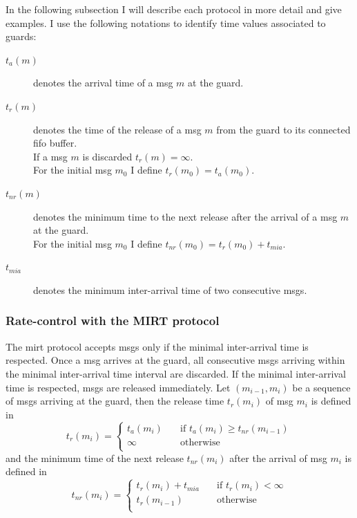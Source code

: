 In the following subsection I will describe each protocol in more detail and give examples.
I use the following notations to identify time values associated to guards:
\begin{description}
    \item[$t_{a}(m)$]
        denotes the arrival time of a \gls*{msg} $m$ at the guard.
    \item[$t_r(m)$]
        denotes the time of the release of a \gls*{msg} $m$ from the guard to its connected \gls{fifo} buffer.\\
        If a \gls*{msg} $m$ is discarded $t_r(m) = \infty$.\\
        For the initial \gls*{msg} $m_0$ I define $t_r(m_0) = t_a(m_0)$.
    \item[$t_{nr}(m)$]
        denotes the minimum time to the next release after the arrival of a \gls*{msg} $m$ at the guard.\\
        For the initial \gls*{msg} $m_0$ I define $t_{nr}(m_0) = t_r(m_0) + t_{mia}$.
    \item[$t_{mia}$]
        denotes the minimum inter-arrival time of two consecutive \glspl*{msg}.
\end{description}

\subsubsection{Rate-control with the MIRT protocol}
The \gls{mirt} protocol accepts \glspl*{msg} only if the minimal inter-arrival time is respected.
Once a \gls*{msg} arrives at the guard, all consecutive \glspl*{msg} arriving within the minimal inter-arrival time interval are discarded.
If the minimal inter-arrival time is respected, \glspl*{msg} are released immediately.
Let $( m_{i-1}, m_i )$ be a sequence of \glspl*{msg} arriving at the guard, then the release time $t_r(m_i)$ of \gls*{msg} $m_i$ is defined in \Equ{\ref{eq_mirt_release}}
\begin{equation}
    t_r(m_i) =
        \begin{cases}
            t_a(m_i) & \quad \text{if } t_a(m_i) \geq t_{nr}(m_{i-1})\\
            \infty   & \quad \text{otherwise}\\
        \end{cases}
    \label{eq_mirt_release}
\end{equation}
and the minimum time of the next release $t_{nr}(m_i)$ after the arrival of \gls*{msg} $m_i$ is defined in \Equ{\ref{eq_mirt_next_release}}
\begin{equation}
    t_{nr}(m_i) =
        \begin{cases}
            t_r(m_i) + t_{mia} & \quad \text{if } t_r(m_i) < \infty\\
            t_r(m_{i-1})       & \quad \text{otherwise}\\
        \end{cases}
    \label{eq_mirt_next_release}
\end{equation}

